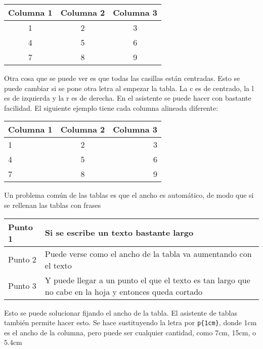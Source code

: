 \begin{center}
	\begin{tabular}{|c|c|c|}
	\hline 
	Columna 1 & Columna 2 & Columna 3 \\ 
	\hline 
	1 & 2 & 3 \\ 
	\hline 
	4 & 5 & 6 \\ 
	\hline 
	7 & 8 & 9 \\ 
	\hline 
\end{tabular} 
\end{center}

Otra cosa que se puede ver es que todas las casillas están centradas. Esto se puede cambiar si se pone otra letra al empezar la tabla. La c es de centrado, la l es de izquierda y la r es de derecha. En el asistente se puede hacer con bastante facilidad. El siguiente ejemplo tiene cada columna alineada diferente:

\begin{center}
	\begin{tabular}{|l|c|r|}
		\hline 
		Columna 1 & Columna 2 & Columna 3 \\ 
		\hline 
		1 & 2 & 3 \\ 
		\hline 
		4 & 5 & 6 \\ 
		\hline 
		7 & 8 & 9 \\ 
		\hline 
	\end{tabular} 
\end{center}

Un problema común de las tablas es que el ancho es automático, de modo que si se rellenan las tablas con frases

\begin{center}
	\begin{tabular}{|l|l|}
	\hline 
	Punto 1 & Si se escribe un texto bastante largo \\ 
	\hline 
	Punto 2 & Puede verse como el ancho de la tabla va aumentando con el texto \\ 
	\hline 
	Punto 3 & Y puede llegar a un punto el que el texto es tan largo que no cabe en la hoja y entonces queda cortado \\ 
	\hline 
\end{tabular} 
\end{center}

Esto se puede solucionar fijando el ancho de la tabla. El asistente de tablas también permite hacer esto. Se hace sustituyendo la letra por \verb!p{1cm}!, donde 1cm es el ancho de la columna, pero puede ser cualquier cantidad, como 7cm, 15cm, o 5.4cm


